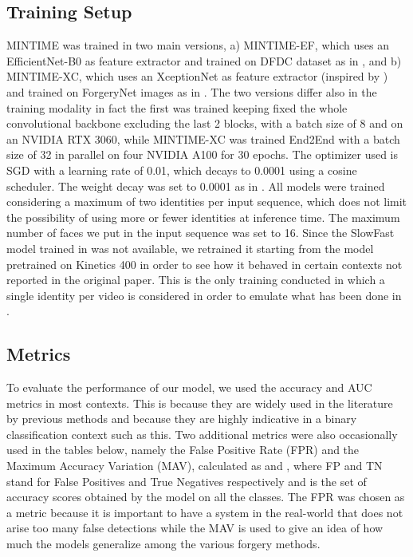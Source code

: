 \documentclass[10pt,twocolumn,letterpaper]{article}
\begin{document}
\subsection{Training Setup}
MINTIME was trained in two main versions, a) MINTIME-EF, which uses an EfficientNet-B0\cite{efficientnet} as feature extractor and trained on DFDC dataset\cite{DFDC} as in \cite{10.1007/978-3-031-06433-3_19}, and b) MINTIME-XC, which uses an XceptionNet\cite{xception} as feature extractor (inspired by \cite{10.1145/3549555.3549588}) and trained on ForgeryNet images as in \cite{forgerynet}.
The two versions differ also in the training modality in fact the first was trained keeping fixed the whole convolutional backbone excluding the last 2 blocks, with a batch size of 8 and on an NVIDIA RTX 3060, while MINTIME-XC was trained End2End with a batch size of 32 in parallel on four NVIDIA A100 for 30 epochs.
The optimizer used is SGD with a learning rate of 0.01, which decays to 0.0001 using a cosine scheduler. The weight decay was set to 0.0001 as in \cite{Bertasius2021IsSA}.
All models were trained considering a maximum of two identities per input sequence, which does not limit the possibility of using more or fewer identities at inference time. The maximum number of faces we put in the input sequence was set to 16. Since the SlowFast\cite{Feichtenhofer_2019_ICCV} model trained in \cite{forgerynet} was not available, we retrained it starting from the model pretrained on Kinetics 400\cite{kinetics} in order to see how it behaved in certain contexts not reported in the original paper. This is the only training conducted in which a single identity per video is considered in order to emulate what has been done in \cite{forgerynet}.

\subsection{Metrics}
To evaluate the performance of our model, we used the accuracy and AUC metrics in most contexts. This is because they are widely used in the literature by previous methods and because they are highly indicative in a binary classification context such as this. Two additional metrics were also occasionally used in the tables below, namely the False Positive Rate (FPR) and the Maximum Accuracy Variation (MAV), calculated as  and , where FP and TN stand for False Positives and True Negatives respectively and  is the set of accuracy scores obtained by the model on all the classes. The FPR was chosen as a metric because it is important to have a system in the real-world that does not arise too many false detections while the MAV is used to give an idea of how much the models generalize among the various forgery methods.
\end{document}
